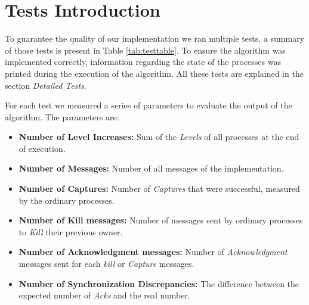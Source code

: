 \section*{Tests Introduction}

	\vspace{10pt}

	\indent To guarantee the quality of our implementation we ran multiple tests, a summary of those tests is present in Table \ref{tab:testtable}. To ensure the algorithm was implemented correctly, information regarding the state of the processes was printed during the execution of the algorithm. All these tests are explained in the section \textit{Detailed Tests}.

	For each test we measured a series of parameters to evaluate the output of the algorithm. The parameters are:

	\begin{itemize}
		\item{\textbf{Number of Level Increases:}} Sum of the \textit{Levels} of all processes at the end of execution. 
		\item{\textbf{Number of Messages:}} Number of all messages of the implementation.
		\item{\textbf{Number of Captures:}} Number of \textit{Captures} that were successful, measured by the ordinary processes.
		\item{\textbf{Number of Kill messages:}} Number of messages sent by ordinary processes to \textit{Kill} their previous owner.
		\item{\textbf{Number of Acknowledgment messages:}} Number of \textit{Acknowledgment} messages sent for each \textit{kill} or \textit{Capture} messages.
		\item{\textbf{Number of Synchronization Discrepancies:}} The difference between the expected number of \textit{Acks} and the real number.

	\end{itemize}

